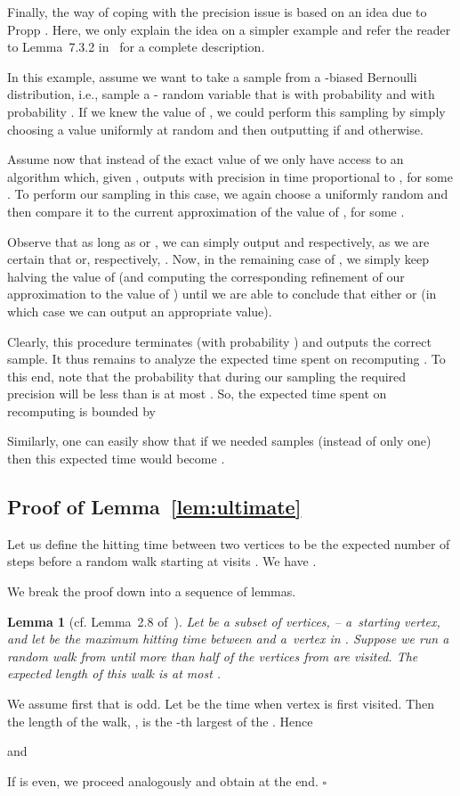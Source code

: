 \documentclass[11pt, letterpaper]{article}
\newtheorem{lemma}[theorem]{Lemma}
\newenvironment{proof}{\noindent{\bf Proof:}\hspace*{1em}}{\qed\bigskip}
\newcommand{\qed}{\hfill\ensuremath{\square}}
\begin{document}
Finally, the way of coping with the precision issue is based on an idea due to Propp \cite{Propp10}. Here, we only explain the idea on a simpler example and refer the reader to Lemma~7.3.2 in~\cite{Madry11} for a complete description. 

In this example, assume we want to take a sample from a -biased Bernoulli distribution, i.e., sample a - random variable that is  with probability  and  with probability . If we knew the value of , we could perform this sampling by simply choosing a value  uniformly at random and then outputting  if  and  otherwise.

Assume now that instead of the exact value of  we only have access to an algorithm which, given , outputs  with precision  in time proportional to , for some . To perform our sampling in this case, we again choose a uniformly random  and then compare it to the current approximation  of the value of , for some . 

Observe that as long as  or , we can simply output  and  respectively, as we are certain that  or, respectively, . Now, in the remaining case of , we simply keep halving the value of  (and computing the corresponding refinement of our approximation to the value of ) until we are able to conclude that either  or  (in which case we can output an appropriate value).

Clearly, this procedure terminates (with probability ) and outputs the correct sample. It thus remains to analyze the expected time spent on recomputing . To this end, note that the probability that during our sampling the required precision will be less than  is at most . So, the expected time spent on recomputing  is bounded by

Similarly, one can easily show that if we needed  samples (instead of only one) then this expected time would become .

\subsection{Proof of Lemma~\ref{lem:ultimate}} \label{app:proof_of_ultimate}

Let us define the hitting time  between two vertices  to be the expected number of steps before a random walk starting at  visits . We have .

We break the proof down into a sequence of lemmas.

\begin{lemma}[cf. Lemma~2.8 of~\cite{Lovasz93}] \label{lem:LovaszCoverLog}
Let  be a subset of vertices,  -- a~starting vertex, and let  be the maximum hitting time between  and a~vertex in . Suppose we run a random walk from  until more than half of the vertices from  are visited. The expected length of this walk is at most .
\end{lemma}
\begin{proof}
We assume first that  is odd. Let  be the time when vertex  is first visited. Then the length of the walk, , is the -th largest of the . Hence

and

If  is even, we proceed analogously and obtain  at the end.
\end{proof}
\end{document}
